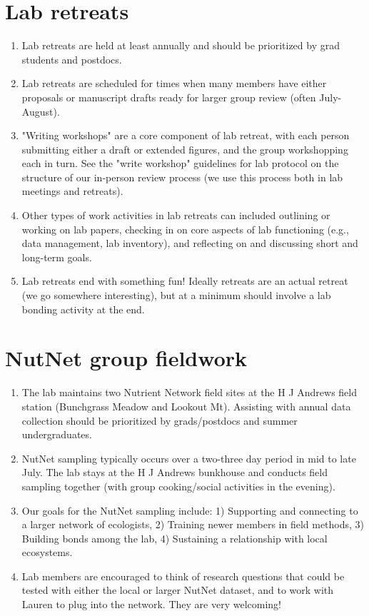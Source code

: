 \documentclass[12pt]{article}
\begin{document}
\section{Lab retreats}
\begin{enumerate}
\item Lab retreats are held at least annually and should be prioritized by grad students and postdocs.
\item Lab retreats are scheduled for times when many members have either proposals or manuscript drafts ready for larger group review (often July-August).
\item "Writing workshops" are a core component of lab retreat, with each person submitting either a draft or extended figures, and the group workshopping each in turn. See the "write workshop" guidelines for lab protocol on the structure of our in-person review process (we use this process both in lab meetings and retreats).
\item Other types of work activities in lab retreats can included outlining or working on lab papers, checking in on core aspects of lab functioning (e.g., data management, lab inventory), and reflecting on and discussing short and long-term goals. 
\item Lab retreats end with something fun! Ideally retreats are an actual retreat (we go somewhere interesting), but at a minimum should involve a lab bonding activity at the end.
\end{enumerate}

\section{NutNet group fieldwork}
\begin{enumerate}
\item The lab maintains two Nutrient Network field sites at the H J Andrews field station (Bunchgrass Meadow and Lookout Mt). Assisting with annual data collection should be prioritized by grads/postdocs and summer undergraduates.
\item NutNet sampling typically occurs over a two-three day period in mid to late July. The lab stays at the H J Andrews bunkhouse and conducts field sampling together (with group cooking/social activities in the evening).
\item Our goals for the NutNet sampling include: 1) Supporting and connecting to a larger network of ecologists, 2) Training newer members in field methods, 3) Building bonds among the lab, 4) Sustaining a relationship with local ecosystems. 
\item Lab members are encouraged to think of research questions that could be tested with either the local or larger NutNet dataset, and to work with Lauren to plug into the network. They are very welcoming!
\end{enumerate}
\end{document}

